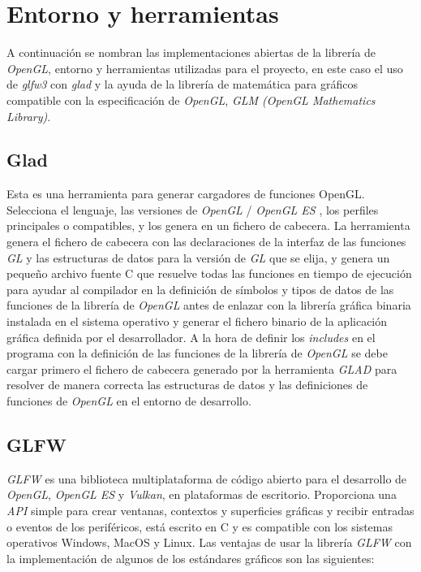 \documentclass[a4paper]{book}
\begin{document}
\section{Entorno y herramientas}
\label{sec:Entorno}

A continuación se nombran las implementaciones abiertas de la librería de \textit{OpenGL}, entorno y herramientas
utilizadas para el proyecto, en este caso el uso de \textit{glfw3} con \textit{glad} y la ayuda de la librería de matemática
para gráficos compatible con la especificación de \textit{OpenGL}, \textit{GLM (OpenGL Mathematics Library)}.

\subsection{Glad}
\label{subsec:Glad}

Esta es una herramienta para generar cargadores de funciones OpenGL. Selecciona el lenguaje, las versiones
de \textit{OpenGL} / \textit{OpenGL ES} , los perfiles principales o compatibles, y los genera en un fichero de cabecera. La herramienta
genera el fichero de cabecera con las declaraciones de la interfaz de las funciones \textit{GL} y
las estructuras de datos para la versión de \textit{GL} que se elija, y genera un pequeño archivo fuente C que
resuelve todas las funciones en tiempo de ejecución para ayudar al compilador en la definición de
símbolos y tipos de datos de las funciones de la librería de \textit{OpenGL} antes de enlazar con la librería
gráfica binaria instalada en el sistema operativo y generar el fichero binario de la aplicación gráfica
definida por el desarrollador. A la hora de definir los \textit{includes} en el programa con la definición de las funciones de la librería de
\textit{OpenGL} se debe cargar primero el fichero de cabecera generado por la herramienta \textit{GLAD} para resolver de
manera correcta las estructuras de datos y las definiciones de funciones de \textit{OpenGL} en el entorno de
desarrollo. \cite{Khronos:_glad}

\subsection{GLFW}
\label{subsec:GLFW}

\textit{GLFW} es una biblioteca multiplataforma de código abierto para el desarrollo de \textit{OpenGL}, \textit{OpenGL ES} y \textit{Vulkan},
en plataformas de escritorio. Proporciona una \textit{API} simple para crear ventanas, contextos y superficies
gráficas y recibir entradas o eventos de los periféricos, está escrito en C y es compatible con los sistemas
operativos Windows, MacOS y Linux. Las ventajas de usar la librería \textit{GLFW} con la implementación de algunos de los
estándares gráficos son las siguientes:
\end{document}

